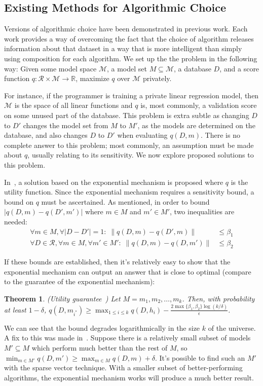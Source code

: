 \documentclass[11pt]{report}
\newtheorem{theorem}{Theorem}
\begin{document}
\subsection{Existing Methods for Algorithmic Choice}

Versions of algorithmic choice have been demonstrated in previous work. Each work provides a way of overcoming the fact that the choice of algorithm releases information about that dataset in a way that is more intelligent than simply using composition for each algorithm. We set up the the problem in the following way: Given some model space $\mathcal{M}$, a model set $M \subseteq \mathcal{M}$, a database $D$, and a score function $q: \mathcal{R} \times \mathcal{M} \rightarrow \mathbb{R}$, maximize $q$ over $\mathcal{M}$ privately.

For instance, if the programmer is training a private linear regression model, then $\mathcal{M}$ is the space of all linear functions and $q$ is, most commonly, a validation score on some unused part of the database. This problem is extra subtle as changing $D$ to $D'$ changes the model set from $M$ to $M'$, as the models are determined on the database, and also changes $D$ to $D'$ when evaluating $q(D, m)$. There is no complete answer to this problem; most commonly, an assumption must be made about $q$, usually relating to its sensitivity. We now explore proposed solutions to this problem.

In~\cite{Chaudhuri:2013}, a solution based on the exponential mechanism is proposed where $q$ is the utility function. Since the exponential mechanism requires a sensitivity bound, a bound on $q$ must be ascertained. As mentioned, in order to bound $|q(D, m) - q(D', m')|$ where $m \in M$ and $m' \in M'$, two inequalities are needed:
\begin{align*}
\forall m\in M,\forall |D-D'|=1:\;\|q(D, m) - q(D', m)\| &\leq \beta_1 \\
\forall D\in \mathcal{R},\forall m \in M,\forall m'\in M':\;\|q(D, m) -  q(D, m')\| &\leq \beta_2
\end{align*}

If these bounds are established, then it's relatively easy to show that the exponential mechanism can output an answer that is close to optimal (compare to the guarantee of the exponential mechanism):
\begin{theorem}\label{thm:dependent_exp}
(Utility guarantee~\cite{Chaudhuri:2013}) Let $M = m_1, m_2, \ldots, m_k$. Then, with probability at least $1-\delta$, $q(D, m_{i^*}) \geq \max_{1\leq i \leq k} q(D, h_i) - \frac{2\max\{\beta_1, \beta_2\}\log(k/\delta)}{\epsilon}$.
\end{theorem}
We can see that the bound degrades logarithmically in the size $k$ of the universe. A fix to this was made in~\cite{Chaudhuri:2014}. Suppose there is a relatively small subset of models $M' \subseteq M$ which perform much better than the rest of $M$, so $\min_{m \in M'} q(D, m') \geq \max_{m \in M} q(D, m) + \delta$. It's possible to find such an $M'$ with the sparse vector technique. With a smaller subset of better-performing algorithms, the exponential mechanism works will produce a much better result.
\end{document}
